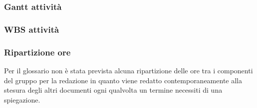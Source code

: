 \subsubsection{Gantt attività}

\subsubsection{WBS attività}
\begin{figure}[H]
	\centering
    \scalebox{0.8}{}
\end{figure}

\subsubsection{Ripartizione ore}
Per il glossario non è stata prevista alcuna ripartizione delle ore tra i componenti del gruppo per la redazione in quanto viene redatto contemporaneamente alla stesura degli altri documenti ogni qualvolta un termine necessiti di una spiegazione.
\bgroup
